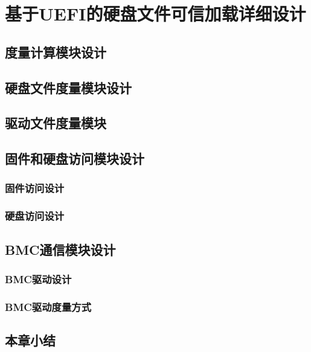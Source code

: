 %
%
\chapter{基于UEFI的硬盘文件可信加载详细设计}
\label{cha:detail_design}
%
%
\section{度量计算模块设计}
%
%
\section{硬盘文件度量模块设计}
%
%
\section{驱动文件度量模块}
%
%
\section{固件和硬盘访问模块设计}

\subsection{固件访问设计}

\subsection{硬盘访问设计}
%
%
\section{BMC通信模块设计}

\subsection{BMC驱动设计}

\subsection{BMC驱动度量方式}
%
%
\section{本章小结}


